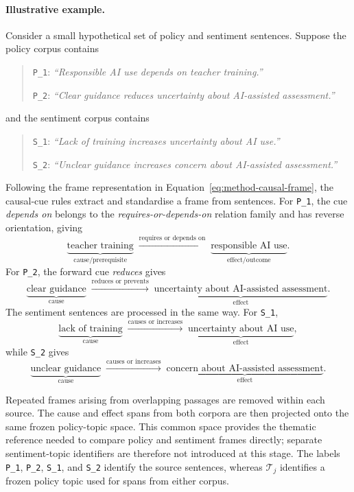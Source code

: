 {\color{blue}
\paragraph{Illustrative example.}
Consider a small hypothetical set of policy and sentiment sentences. Suppose the
policy corpus contains
\begin{quote}
\texttt{P\_1}: \textit{``Responsible AI use depends on teacher training.''}

\texttt{P\_2}: \textit{``Clear guidance reduces uncertainty about AI-assisted
assessment.''}
\end{quote}
\noindent and the sentiment corpus contains
\begin{quote}
\texttt{S\_1}: \textit{``Lack of training increases uncertainty about AI use.''}

\texttt{S\_2}: \textit{``Unclear guidance increases concern about AI-assisted
assessment.''}
\end{quote}

Following the frame representation in
Equation~\ref{eq:method-causal-frame}, the causal-cue rules extract and
standardise a frame from sentences. For \texttt{P\_1}, the cue
\textit{depends on} belongs to the \textit{requires-or-depends-on} relation
family and has reverse orientation, giving
\[
\underbrace{\text{teacher training}}_{\text{cause/prerequisite}}
\;\xrightarrow{\text{requires or depends on}}\;
\underbrace{\text{responsible AI use}}_{\text{effect/outcome}}.
\]
For \texttt{P\_2}, the forward cue \textit{reduces} gives
\[
\underbrace{\text{clear guidance}}_{\text{cause}}
\;\xrightarrow{\text{reduces or prevents}}\;
\underbrace{\text{uncertainty about AI-assisted assessment}}_{\text{effect}}.
\]
The sentiment sentences are processed in the same way. For \texttt{S\_1},
\[
\underbrace{\text{lack of training}}_{\text{cause}}
\;\xrightarrow{\text{causes or increases}}\;
\underbrace{\text{uncertainty about AI use}}_{\text{effect}},
\]
while \texttt{S\_2} gives
\[
\underbrace{\text{unclear guidance}}_{\text{cause}}
\;\xrightarrow{\text{causes or increases}}\;
\underbrace{\text{concern about AI-assisted assessment}}_{\text{effect}}.
\]

Repeated frames arising from overlapping passages are removed within each source. The
cause and effect spans from both corpora are then projected onto the same frozen
policy-topic space. This common space provides the thematic reference needed to
compare policy and sentiment frames directly; separate sentiment-topic identifiers
are therefore not introduced at this stage. The labels \texttt{P\_1}, \texttt{P\_2},
\texttt{S\_1}, and \texttt{S\_2} identify the source sentences, whereas
$\mathcal{T}_j$ identifies a frozen policy topic used for spans from either corpus.

}
